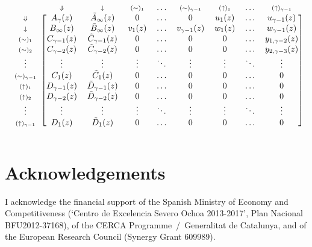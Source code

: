 \documentclass{article}
\newcommand{\DN}{\scriptstyle{\Downarrow}}
\newcommand{\dn}{\scriptstyle{\downarrow}}
\newcommand{\up}[1]{\scriptstyle{(\uparrow)_{#1}}}
\newcommand{\eq}[1]{\scriptstyle{(\sim)_{#1}}}
\begin{document}
\begin{equation*}
\begin{blockarray}{ccccccccc}
   & \DN & \dn &\eq{1} & \ldots & \eq{\gamma-1} &
    \up{1} & \ldots & \up{\gamma-1} \\
\begin{block}{c[cccccccc]}
\DN & A_\gamma(z) & \tilde{A}_\infty(z) & 0 & \ldots & 0 & u_1(z)
    & \ldots & u_{\gamma-1}(z) \\
\dn & B_\infty(z) & \tilde{B}_\infty(z) & v_1(z) & \ldots &
    v_{\gamma-1}(z) & w_1(z) & \ldots & w_{\gamma-1}(z) \\
\eq{1} & C_{\gamma-1}(z) & \tilde{C}_{\gamma-1}(z) & 0 & \ldots & 0 & 0 &
    \ldots & y_{1,\gamma-2}(z) \\
\eq{2} & C_{\gamma-2}(z) & \tilde{C}_{\gamma-2}(z) & 0 & \ldots & 0 & 0 &
    \ldots & y_{2,\gamma-3}(z) \\
\vdots & \vdots & \vdots & \vdots & \ddots & \vdots & \vdots &
    \ddots & \vdots \\
\eq{\gamma-1} & C_1(z) & \tilde{C}_1(z) & 0 & 
    \ldots & 0 & 0 & \ldots & 0 \\
\up{1} & D_{\gamma-1}(z) & \tilde{D}_{\gamma-1}(z) & 0 & \ldots & 0 & 0 &
    \ldots & 0 \\
\up{2} & D_{\gamma-2}(z) & \tilde{D}_{\gamma-2}(z) & 0 & \ldots & 0 & 0 &
    \ldots & 0  \\
\vdots & \vdots & \vdots & \vdots & \ddots & \vdots & \vdots &
    \ddots & \vdots \\
\up{\gamma-1} & D_1(z) & \tilde{D}_1(z) & 0 & \ldots & 0 & 0 &
    \ldots & 0 \\
\end{block}
\end{blockarray}
\end{equation*}


\section*{Acknowledgements}

I acknowledge the financial support of the Spanish Ministry of Economy and
Competitiveness (‘Centro de Excelencia Severo Ochoa 2013-2017’, Plan
Nacional BFU2012-37168), of the CERCA Programme~/~Generalitat de
Catalunya, and of the European Research Council (Synergy Grant 609989).






\end{document}
